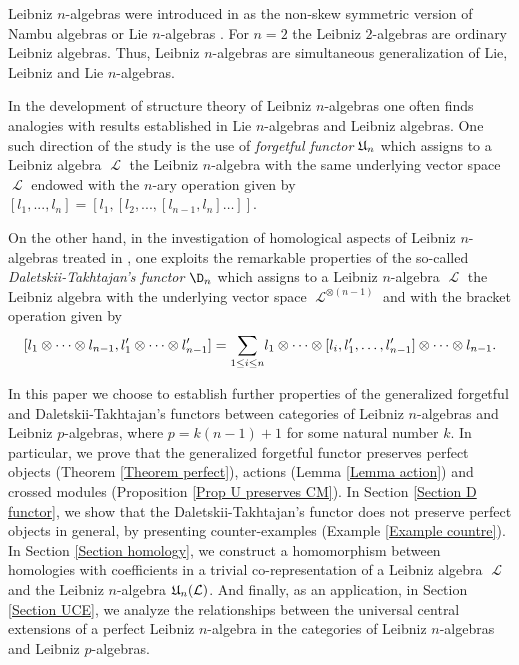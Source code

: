 \documentclass[12pt, reqno]{amsart}
\def\Lb{\operatorname{\textbf{\textsf{Lb}}}}
\def\nLb{\operatorname{{}_{n}\textbf{\textsf{Lb}}}}
\def\U{\operatorname{\frak{U}}}
\def\ele{\operatorname{\mathcal{L}}}
\begin{document}
Leibniz $n$-algebras were introduced in \cite{CLP} as the non-skew symmetric version of Nambu algebras \cite{DT, Na} or Lie $n$-algebras \cite{Fi}.
For $n=2$ the Leibniz $2$-algebras are ordinary Leibniz algebras. Thus, Leibniz $n$-algebras are simultaneous generalization of Lie, Leibniz and Lie $n$-algebras.

In the development of structure theory of Leibniz $n$-algebras one often finds analogies with results established in Lie $n$-algebras and Leibniz algebras. One such direction of the study is the use of \emph{forgetful functor} $\U_n$ which assigns to a Leibniz algebra $\ele$ the Leibniz $n$-algebra with the same underlying vector space $\ele$ endowed with the $n$-ary operation given by $[l_1, ..., l_n] = [l_1,[l_2, ...,[l_{n-1},l_n]\dots]]$.


On the other hand, in the investigation of homological aspects of Leibniz $n$-algebras treated in \cite{Ca, Ca 1, Ca 2}, one exploits the
remarkable properties of the so-called \emph{Daletskii-Takhtajan's functor}  $\D_n$ which assigns to a Leibniz $n$-algebra $\ele$ the Leibniz algebra with the underlying vector space $\ele^{\otimes(n-1)}$ and with the bracket operation given by 
\[
[l_1\otimes\cdots\otimes l_{n-1}, l'_1\otimes\cdots\otimes
l'_{n-1}]=\underset{\scriptsize{1\leq i\leq n}}\sum
l_1\otimes\cdots\otimes
[l_i,l'_1,\dots,l'_{n-1}]\otimes\cdots\otimes l_{n-1}.
\]


In this paper we choose to establish further properties of the generalized forgetful and Daletskii-Takhtajan's functors between categories of Leibniz $n$-algebras and Leibniz $p$-algebras, where $p=k(n-1)+1$ for some natural number $k$. In particular, we prove that the generalized forgetful functor preserves perfect objects (Theorem \ref{Theorem perfect}), actions (Lemma \ref{Lemma action}) and crossed modules (Proposition \ref{Prop U preserves CM}).
In Section \ref{Section D functor}, we show that the Daletskii-Takhtajan's functor does not preserve perfect objects in general, by presenting counter-examples (Example \ref{Example countre}).
In Section \ref{Section homology}, we construct a homomorphism between homologies with coefficients in a trivial co-representation of a Leibniz algebra $\ele$ and the Leibniz $n$-algebra $\U_{n}(\ele)$. And finally, as an application, in Section \ref{Section UCE}, we analyze the relationships between the universal central extensions of a perfect Leibniz $n$-algebra in the categories of Leibniz $n$-algebras and Leibniz $p$-algebras.
\end{document}

